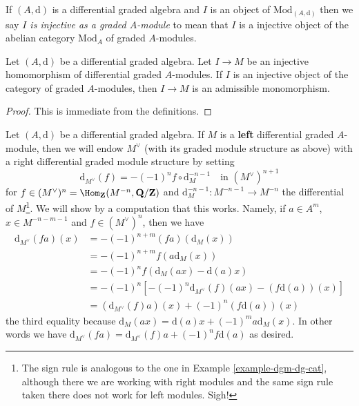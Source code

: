 \medskip\noindent
If $(A, \text{d})$ is a differential graded algebra and $I$ is
an object of $\text{Mod}_{(A, \text{d})}$ then we say
{\it $I$ is injective as a graded $A$-module} to mean
that $I$ is a injective object of the abelian category $\text{Mod}_A$
of graded $A$-modules.

\begin{lemma}
\label{lemma-source-graded-injective}
Let $(A, \text{d})$ be a differential graded algebra.
Let $I \to M$ be an injective homomorphism of differential graded
$A$-modules. If $I$ is an injective object of the category
of graded $A$-modules, then $I \to M$ is an admissible monomorphism.
\end{lemma}

\begin{proof}
This is immediate from the definitions.
\end{proof}

\noindent
Let $(A, \text{d})$ be a differential graded algebra. If $M$ is a
{\bf left} differential graded $A$-module, then we will endow $M^\vee$
(with its graded module structure as above) with a right differential
graded module structure by setting
$$
\text{d}_{M^\vee}(f) = - (-1)^n f \circ \text{d}_M^{-n - 1}
\quad\text{in }(M^\vee)^{n + 1}
$$
for $f \in (M^\vee)^n = \Hom_\mathbf{Z}(M^{-n}, \mathbf{Q}/\mathbf{Z})$
and $\text{d}_M^{-n - 1} : M^{-n - 1} \to M^{-n}$ the differential
of $M$\footnote{The sign rule is analogous to the one in
Example \ref{example-dgm-dg-cat}, although there we are working with
right modules and the same sign rule taken there does not work for
left modules. Sigh!}.
We will show by a computation that this works.
Namely, if $a \in A^m$, $x \in M^{-n - m - 1}$ and $f \in (M^\vee)^n$,
then we have
\begin{align*}
\text{d}_{M^\vee}(f a)(x) & =
- (-1)^{n + m} (f a)(\text{d}_M(x)) \\
& =
- (-1)^{n + m} f(a\text{d}_M(x)) \\
& =
-(-1)^n f(\text{d}_M(ax) - \text{d}(a)x) \\
& =
-(-1)^n[-(-1)^n \text{d}_{M^\vee}(f)(ax) - (f\text{d}(a))(x)] \\
& =
(\text{d}_{M^\vee}(f)a)(x) + (-1)^n (f\text{d}(a))(x)
\end{align*}
the third equality because
$\text{d}_M(ax) = \text{d}(a)x + (-1)^m a\text{d}_M(x)$.
In other words we have
$\text{d}_{M^\vee}(fa) = \text{d}_{M^\vee}(f)a + (-1)^n f \text{d}(a)$
as desired.

